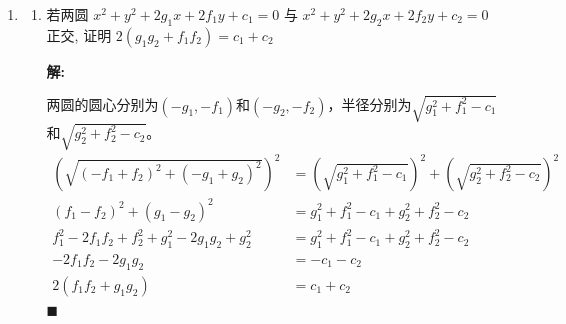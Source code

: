 \documentclass[10pt]{article}
\newcommand{\sol}{\textbf{解:} }
\begin{document}
\begin{enumerate}[leftmargin=*]
  \item \begin{enumerate}
          \item 若两圆 $x^{2}+y^{2}+2 g_{1} x+2 f_{1} y+c_{1}=0$ 与 $x^{2}+y^{2}+2 g_{2} x+2 f_{2} y+c_{2}=0$ 正交, 证明 $2\left(g_{1} g_{2}+f_{1} f_{2}\right)=c_{1}+c_{2}$

                \sol{}

                两圆的圆心分别为$(-g_1, -f_1)$和$(-g_2, -f_2)$，半径分别为$\sqrt{g_1^2 + f_1^2 - c_1}$和$\sqrt{g_2^2 + f_2^2 - c_2}$。
                \begin{align*}
                  \left(\sqrt{(-f_1 + f_2)^2 + (-g_1 + g_2)^2}\right)^2 & = \left(\sqrt{g_1^2 + f_1^2 - c_1}\right)^2 + \left(\sqrt{g_2^2 + f_2^2 - c_2}\right)^2 \\
                  (f_1 - f_2)^2 + (g_1 - g_2)^2                         & = g_1^2 + f_1^2 - c_1 + g_2^2 + f_2^2 - c_2                                             \\
                  f_1^2 - 2f_1f_2 + f_2^2 + g_1^2 - 2g_1g_2 + g_2^2     & = g_1^2 + f_1^2 - c_1 + g_2^2 + f_2^2 - c_2                                             \\
                  - 2f_1f_2 - 2g_1g_2                                   & = - c_1 - c_2                                                                           \\
                  2(f_1f_2 + g_1g_2)                                    & = c_1 + c_2
                \end{align*} \hfill$\blacksquare$


\end{enumerate}
\end{enumerate}
\end{document}
